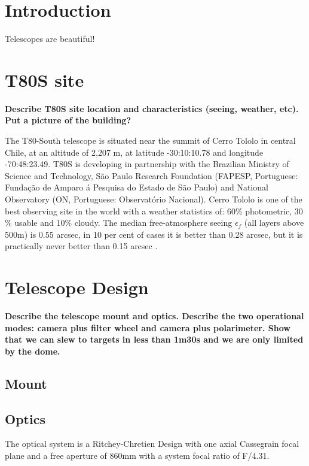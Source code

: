 \documentclass[12pt,preprint]{aastex}
\begin{document}

\section{Introduction}

Telescopes are beautiful! \citep{Benitez.etal.2014a}


\section{T80S site}

{\bf \color{red} Describe T80S site location and characteristics (seeing, weather, etc). Put a picture of the building?}

The T80-South telescope is situated near the summit of Cerro Tololo in central Chile, at an altitude of 2,207 m, at latitude -30:10:10.78 and longitude -70:48:23.49. T80S  is
developing in partnership with the Brazilian Ministry of Science and Technology, S\~ao Paulo Research Foundation (FAPESP, Portuguese: Funda\c c\~ao de Amparo \'a Pesquisa do Estado de S\~ao Paulo) and National Observatory (ON, Portuguese: Observat\'orio Nacional). Cerro Tololo is one of the best observing site in the world with a weather statistics of: 60$\%$ photometric, 30$\%$ usable and 10$\%$ cloudy. The median free-atmosphere seeing $\epsilon_f$ (all layers above 500m) is 0.55 arcsec, in 10 per cent of cases it is better than 0.28 arcsec, but it is practically never better than 0.15 arcsec \citep{Tokovinin.Baumont.Vasquez.2003a}.


\section{Telescope Design}
{\bf \color{red} Describe the telescope mount and optics. Describe the two operational modes: camera plus filter wheel and camera plus polarimeter. Show that we can slew to targets in less than 1m30s and we are only limited by the dome.}

\subsection{Mount}

\subsection{Optics}
The optical system is a Ritchey-Chretien Design with one axial Cassegrain focal plane and a free aperture of 860mm with a system focal ratio of F/4.31.
\end{document}
